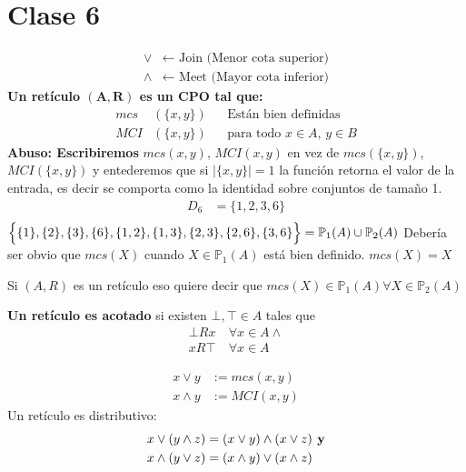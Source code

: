 \documentclass[../main.tex]{subfiles}
\begin{document}
\chapter*{Clase 6}%
\thispagestyle{fancy}

\begin{align*}
	\vee &\longleftarrow\text{ Join (Menor cota superior)}\\
	\wedge &\longleftarrow\text{ Meet (Mayor cota inferior)}
\end{align*}
\textbf{Un retículo $\mathbf{(A,R)}$ es un $\mathbf{CPO}$ tal que:}
\begin{align*}
	mcs&(\{x,y\}) && \text{Están bien definidas}\\
	MCI&(\{x,y\}) && \text{para todo $x\in A$, $y \in B$}
\end{align*}
\textbf{Abuso: Escribiremos}
$mcs(x,y)$, $MCI(x,y)$ en vez de $mcs(\{x,y\})$, $MCI(\{x,y\})$
y entederemos que si $|\{x,y\}|=1$ la función retorna el valor de la entrada,
es decir se comporta como la identidad sobre conjuntos de tamaño 1.
\begin{align*}
	D_6 &= \{1,2,3,6\}\\
\end{align*}
$\Big{\{}\{1\},\{2\},\{3\},\{6\},\{1,2\},\{1,3\},\{2,3\},\{2,6\},\{3,6\}\Big{\}}
=\mathbb{P}_1(A)\cup\mathbb{P}_2(A)$
Debería ser obvio que $mcs(X)$ cuando $X\in \mathbb{P}_1(A)$
está bien definido.
$mcs(X)=X$

Si $(A,R)$ es un retículo eso quiere decir que $mcs(X)\in \mathbb{P}_1(A)\forall X \in
\mathbb{P}_2(A)$

\textbf{Un retículo es acotado}
si existen $\bot , \top \in A$ tales que
\begin{align*}
	\bot Rx \ &\forall x \in A\wedge\\
	xR\top \  &\forall x \in A
\end{align*}

\begin{align*}
	x\vee y &:=mcs(x,y)\\
	x\wedge y &:=MCI(x,y)
\end{align*}
Un retículo es distributivo:
\begin{align*}
	x\vee(y\wedge z) &= (x\vee y)\wedge(x\vee z) \text{\textbf{\ y}}\\
	x\wedge(y\vee z) &= (x\wedge y)\vee (x\wedge z)
\end{align*}
\end{document}

